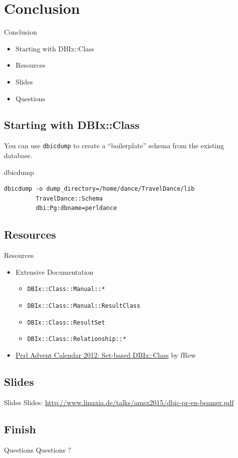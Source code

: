 \section{Conclusion}

\begin{frame}{Conclusion}
\begin{itemize}
\item Starting with DBIx::Class
\item Resources
\item Slides
\item Questions
\end{itemize}
\end{frame}

\subsection{Starting with DBIx::Class}

You can use \verb|dbicdump| to create a ``boilerplate'' schema from the
existing database.

\begin{frame}[fragile]{dbicdump}
\begin{lstlisting}
dbicdump -o dump_directory=/home/dance/TravelDance/lib 
         TravelDance::Schema 
         dbi:Pg:dbname=perldance
\end{lstlisting}
\end{frame}

\subsection{Resources}
\begin{frame}[fragile]{Resources}
\begin{itemize}
\item Extensive Documentation
\begin{itemize}
\item \verb|DBIx::Class::Manual::*|
\item \verb|DBIx::Class::Manual::ResultClass|
\item \verb|DBIx::Class::ResultSet|
\item \verb|DBIx::Class::Relationship::*|
\end{itemize}
\item \href{http://www.perladvent.org/2012/2012-12-21.html}
{Perl Advent Calendar 2012: Set-based DBIx::Class}
by fRew
\end{itemize}
\end{frame}

\subsection{Slides}

\begin{frame}{Slides}
Slides:
\url{http://www.linuxia.de/talks/amsx2015/dbic-pr-en-beamer.pdf}
\end{frame}

\subsection{Finish}

\begin{frame}{Questions}
\centering
Questions ?
\end{frame}



